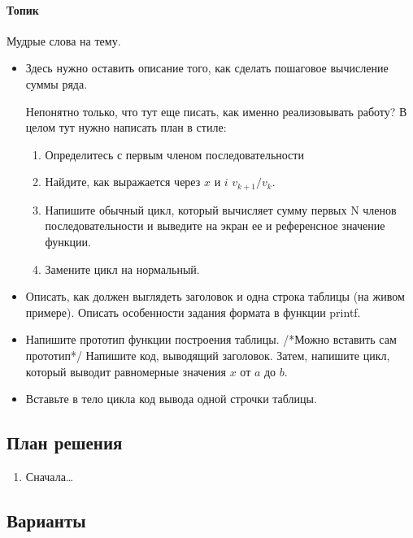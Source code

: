 \paragraph{Топик}
Мудрые слова на тему.

\begin{itemize}
	\item Здесь нужно оставить описание того, как сделать пошаговое вычисление суммы ряда.
	
	Непонятно только, что тут еще писать, как именно реализовывать работу? В целом тут нужно написать план в стиле:
	\begin{enumerate}
		\item Определитесь с первым членом последовательности
		\item Найдите, как выражается через $x$ и $i$ $v_{k+1}/v_k$. 
		\item Напишите обычный цикл, который вычисляет сумму  первых N членов последовательности и выведите на экран ее и референсное значение функции.
		\item Замените цикл на нормальный.
		 
	\end{enumerate}
	\item Описать, как должен выглядеть заголовок и одна строка таблицы (на живом примере). Описать особенности задания формата в функции printf.
	\item Напишите прототип функции построения таблицы. /*Можно вставить сам прототип*/ Напишите код, выводящий заголовок.
	Затем, напишите цикл, который выводит равномерные значения $x$ от $a$ до $b$. 
	\item Вставьте в тело цикла код вывода одной строчки таблицы.
\end{itemize}


\subsection*{План решения}


\begin{enumerate}
\item Сначала\dots
\end{enumerate}


\subsection*{Варианты}


